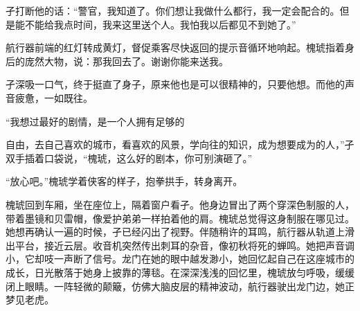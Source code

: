 \documentclass{article}
\begin{document}
孑打断他的话：“警官，我知道了。你们想让我做什么都行，我一定会配合的。但是能不能给我点时间，我来这里送个人。我怕我以后都见不到她了。”

航行器前端的红灯转成黄灯，督促乘客尽快返回的提示音循环地响起。槐琥指着身后的庞然大物，说：那我回去了。谢谢你能来送我。

孑深吸一口气，终于挺直了身子，原来他也是可以很精神的，只要他想。而他的声音疲惫，一如既往。

“我想过最好的剧情，是一个人拥有足够的

\newpage 

自由，去自己喜欢的城市，看喜欢的风景，学向往的知识，成为想要成为的人，”孑双手插着口袋说，“槐琥，这么好的剧本，你可别演砸了。”

“放心吧。”槐琥学着侠客的样子，抱拳拱手，转身离开。

槐琥回到车厢，坐在座位上，隔着窗户看孑。他身边冒出了两个穿深色制服的人，带着墨镜和贝雷帽，像爱护弟弟一样拍着他的肩。槐琥总觉得这身制服在哪见过。她想再确认一遍的时候，孑已经闪出了视野。伴随稍许的耳鸣，航行器从轨道上滑出平台，接近云层。收音机突然传出刺耳的杂音，像初秋将死的蝉鸣。她把声音调小，它却吱一声断了信号。龙门在她的眼中越发渺小，她回忆起自己在这座城市的成长，日光散落于她身上披靠的薄毯。在深深浅浅的回忆里，槐琥放匀呼吸，缓缓闭上眼睛。一阵轻微的颠簸，仿佛大脑皮层的精神波动，航行器驶出龙门边，她正梦见老虎。
\end{document}

